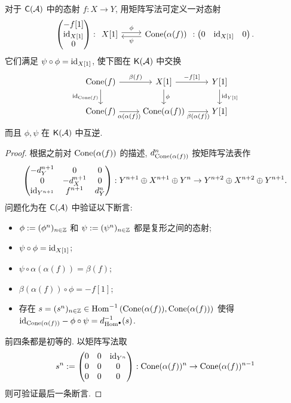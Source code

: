 \begin{lemma}\label{prop:cone-alpha}
	对于 $\mathsf{C}(\mathcal{A})$ 中的态射 $f: X \to Y$, 用矩阵写法可定义一对态射
	\[ \begin{pmatrix} -f[1] \\ \identity_{X[1]} \\ 0 \end{pmatrix} : \begin{tikzcd} X[1] \arrow[r, shift left, "\phi"] & \Cone(\alpha(f)) \arrow[l, shift left, "\psi"] \end{tikzcd} : \begin{pmatrix} 0 & \identity_{X[1]} & 0 \end{pmatrix}. \]
	它们满足 $\psi \circ \phi = \mathrm{id}_{X[1]}$, 使下图在 $\mathsf{K}(\mathcal{A})$ 中交换
	\[\begin{tikzcd}
		\Cone(f) \arrow[d, "{\identity_{\Cone(f)}}"'] \arrow[r, "\beta(f)"] & X[1] \arrow[d, "\phi"] \arrow[r, "{-f[1]}"] & Y[1] \arrow[d, "{\identity_{Y[1]}}"] \\
		\Cone(f) \arrow[r, "{\alpha(\alpha(f))}"'] & \Cone(\alpha(f)) \arrow[r, "\beta(\alpha(f))"'] & Y[1]
	\end{tikzcd}\]
	而且 $\phi, \psi$ 在 $\mathsf{K}(\mathcal{A})$ 中互逆.
\end{lemma}
\begin{proof}
	根据之前对 $\operatorname{Cone}(\alpha(f))$ 的描述, $d_{\operatorname{Cone}(\alpha(f))}^n$ 按矩阵写法表作
	\[ \begin{pmatrix} -d_Y^{n+1} & 0 & 0 \\ 0 & -d_X^{n+1} & 0 \\ \mathrm{id}_{Y^{n+1}} & f^{n+1} & d_Y^n \end{pmatrix} : Y^{n+1} \oplus X^{n+1} \oplus Y^n \to Y^{n+2} \oplus X^{n+2} \oplus Y^{n+1}. \]
	问题化为在 $\mathsf{C}(\mathcal{A})$ 中验证以下断言:
	\begin{itemize}
		\item $\phi := (\phi^n)_{n \in \mathbb{Z}}$ 和 $\psi := (\psi^n)_{n \in \mathbb{Z}}$ 都是复形之间的态射;
		\item $\psi \circ \phi = \mathrm{id}_{X[1]}$;
		\item $\psi \circ \alpha(\alpha(f)) = \beta(f)$;
		\item $\beta(\alpha(f)) \circ \phi = -f[1]$;
		\item 存在 $s = (s^n)_{n \in \mathbb{Z}} \in \operatorname{Hom}^{-1}\left(\operatorname{Cone}(\alpha(f)), \operatorname{Cone}(\alpha(f))\right)$ 使得 $\mathrm{id}_{\operatorname{Cone}(\alpha(f))} - \phi \circ \psi = d^{-1}_{\operatorname{Hom}^\bullet} (s)$.
	\end{itemize}
	前四条都是初等的. 以矩阵写法取
	\[ s^n := \begin{pmatrix} 0 & 0 & \mathrm{id}_{Y^n} \\ 0 & 0 & 0 \\ 0 & 0 & 0 \end{pmatrix}: \operatorname{Cone}(\alpha(f))^n \to \operatorname{Cone}(\alpha(f))^{n-1} \]
	则可验证最后一条断言.
\end{proof}

